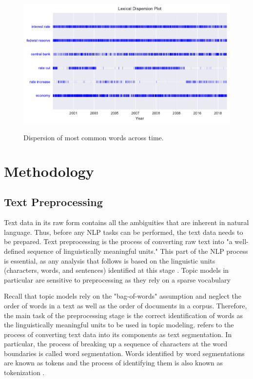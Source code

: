 \documentclass[11pt,a4paper,english,oneside]{book}
\numberwithin{equation}{chapter}
\begin{document}
\begin{figure}
	\caption{Dispersion of most common words across time.}
	\centering
	\includegraphics[scale=1]{Images/dispersionplot_CHtextdata.pdf}
	\label{dispersion}
\end{figure}

	


\section{Methodology}


\subsection{Text Preprocessing}\label{preprocessing}
Text data in its raw form contains all the ambiguities that are inherent in natural language. Thus, before any NLP tasks can be performed, the text data needs to be prepared. Text preprocessing is the process of converting raw text into "a well-defined sequence of linguistically meaningful units." This part of the NLP process is essential, as any analysis that follows is based on the linguistic units (characters, words, and sentences) identified at this stage \cite[p. 9]{Palmer.2010}. Topic models in particular are sensitive to preprocessing as they rely on a sparse vocabulary \cite[p. 288]{Schofield.2016}

Recall that topic models rely on the "bag-of-words" assumption and neglect the order of words in a text as well as the order of documents in a corpus. Therefore, the main task of the preprocessing stage is the correct identification of words as the linguistically meaningful units to be used in topic modeling. \citet[p. 10]{Palmer.2010} refers to the process of converting text data into its components as text segmentation. In particular, the process of breaking up a sequence of characters at the word boundaries is called word segmentation. Words identified by word segmentations are known as tokens and the process of identifying them is also known as tokenization \citep[p. 10]{Palmer.2010}.
\end{document}
